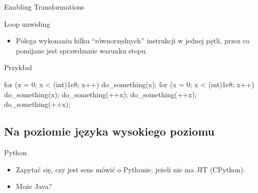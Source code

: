 \begin{frame}[fragile]{Enabling Transformations}
	\begin{block}{Loop unwiding} %
		\begin{itemize}
		 \item Polega wykonaniu kilku ``równorzędnych'' instrukcji w jednej pętli, przez co pomijane jest
		 sprawdzanie warunku stopu.
		\end{itemize}
	\end{block}
	\begin{block}{Przykład}
		\begin{cpp}
		for (x = 0; x < (int)1e8; x++)
		{
		    do_something(x);
		}
		for (x = 0; x < (int)1e8; x++)
		{
		    do_something(x);
		    do_something(++x);
		    do_something(++x);
		    do_something(++x);
		}
		\end{cpp}
	\end{block}
\end{frame}
\subsection{Na poziomie języka wysokiego poziomu}
\begin{frame}[fragile]{Python}
	\begin{itemize}
		\item Zapytać się, czy jest sens mówić o Pythonie, jeżeli nie ma JIT (CPython).
		\item Może Java?
	\end{itemize}
\end{frame}

